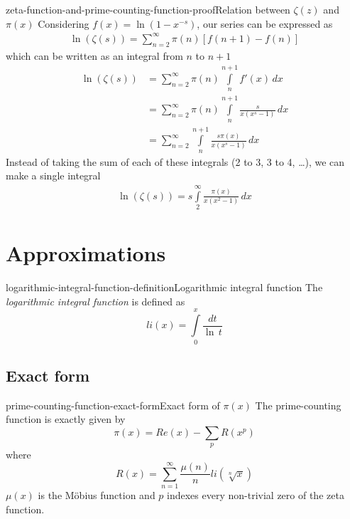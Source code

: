\documentclass[preview]{standalone}
\begin{document}
\begin{snippettheorem}{zeta-function-and-prime-counting-function-proof}{Relation between \(\zeta(z)\) and \(\pi(x)\)}
    Considering \(f(x)=\ln(1-x^{-s})\), our series can be expressed as
    \begin{align*}
        \ln\left(\zeta(s)\right)=
        \sum_{n=2}^{\infty}\pi(n)\left[f(n+1)-f(n)\right]
    \end{align*}
    which can be written as an integral from \(n\) to \(n+1\)
    \begin{align*}
        \ln\left(\zeta(s)\right)&=
        \sum_{n=2}^{\infty}\pi(n)
        \int\limits_n^{n+1} f'(x)\,dx
        \\
        &=
        \sum_{n=2}^{\infty}\pi(n)
        \int\limits_n^{n+1}
        \frac{s}{x(x^s-1)}\,dx
        \\
        &=
        \sum_{n=2}^{\infty}
        \int\limits_n^{n+1}
        \frac{s\pi(x)}{x(x^s-1)}\,dx
    \end{align*}
    Instead of taking the sum of each of these integrals (2 to 3, 3 to 4, \ldots), we can make a single integral
    \begin{align*}
        \ln\left(\zeta(s)\right)=
        s\int\limits_2^\infty
        \frac{\pi(x)}{x(x^2-1)}\,dx
    \end{align*}
\end{snippettheorem}

\section{Approximations}


\begin{snippetdefinition}{logarithmic-integral-function-definition}{Logarithmic integral function}
    The \textit{logarithmic integral function} is defined as
    \[
        li(x)=\int\limits_0^{x} \frac{dt}{\ln\,t}
    \]
\end{snippetdefinition}


\subsection{Exact form}

\begin{snippettheorem}{prime-counting-function-exact-form}{Exact form of \(\pi(x)\)}
    The prime-counting function is exactly given by
    \[
        \pi(x)=Re(x)-\sum_{p}R(x^p)
    \]
    where
    \[
        R(x)=\sum_{n=1}^{\infty}\frac{\mu(n)}{n}li(\sqrt[n]{x})
    \]
    \(\mu(x)\) is the Möbius function and
    \(p\) indexes every non-trivial zero of the zeta function.
\end{snippettheorem}
\end{document}
